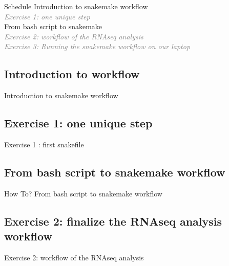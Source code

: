 
\begin{frame}{Schedule}
Introduction to snakemake workflow\\
\quad \quad \textcolor{gray}{\it Exercise 1: one unique step}\\
From bash script to snakemake\\
\quad \quad \textcolor{gray}{\it Exercise 2: workflow of the RNAseq analysis}\\
\quad \quad \textcolor{gray}{\it Exercise 3: Running the snakemake workflow on our laptop}\\
\end{frame}

\subsection[WorkflowIntro]{Introduction to workflow}
\begin{frame}{}
    \huge{Introduction to snakemake workflow}
\end{frame}


\subsection[SnakemakeEx1]{Exercise 1: one unique step}
\begin{frame}{}
    \huge{Exercise 1 : first snakefile}
\end{frame}


\subsection[bash2snakemake]{From bash script to snakemake workflow}
\begin{frame}{How To?}
    \huge{From bash script to snakemake workflow}
\end{frame}


\subsection[SnakemakeEx2]{Exercise 2: finalize the RNAseq analysis workflow}
\begin{frame}{}
    \huge{Exercise 2: workflow of the RNAseq analysis}
\end{frame}



